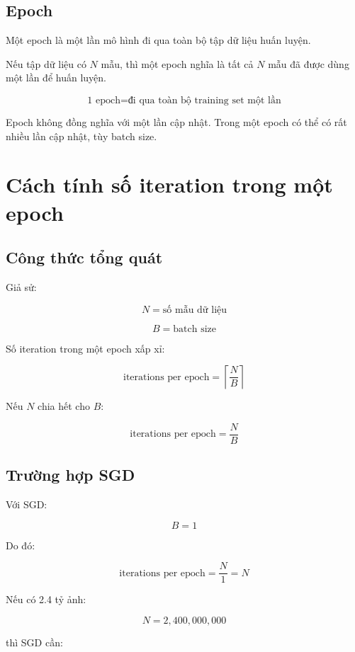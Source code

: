 \subsection{Epoch}

Một epoch là một lần mô hình đi qua toàn bộ tập dữ liệu huấn luyện.

Nếu tập dữ liệu có $N$ mẫu, thì một epoch nghĩa là tất cả $N$ mẫu đã được dùng một lần để huấn luyện.

\[
    \text{1 epoch}
    =
    \text{đi qua toàn bộ training set một lần}
\]

\begin{ghinho}
Epoch không đồng nghĩa với một lần cập nhật. Trong một epoch có thể có rất nhiều lần cập nhật, tùy batch size.
\end{ghinho}

\section{Cách tính số iteration trong một epoch}

\subsection{Công thức tổng quát}

Giả sử:

\[
    N = \text{số mẫu dữ liệu}
\]

\[
    B = \text{batch size}
\]

Số iteration trong một epoch xấp xỉ:

\[
    \text{iterations per epoch}
    =
    \left\lceil
    \frac{N}{B}
    \right\rceil
\]

Nếu $N$ chia hết cho $B$:

\[
    \text{iterations per epoch}
    =
    \frac{N}{B}
\]

\subsection{Trường hợp SGD}

Với SGD:

\[
    B=1
\]

Do đó:

\[
    \text{iterations per epoch}
    =
    \frac{N}{1}
    =
    N
\]

Nếu có 2.4 tỷ ảnh:

\[
    N=2,400,000,000
\]

thì SGD cần:

